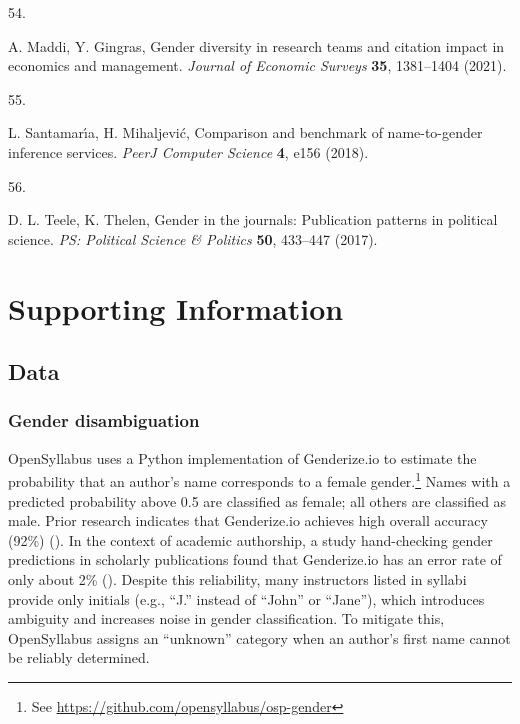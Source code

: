 \documentclass[
  british,
  11pt,
]{article}
\newlength{\cslhangindent}
\newlength{\csllabelwidth}
\newenvironment{CSLReferences}[2] %
 {\begin{list}{}{%
  \setlength{\itemindent}{0pt}
  \setlength{\leftmargin}{0pt}
  \setlength{\parsep}{0pt}
  \ifodd #1
   \setlength{\leftmargin}{\cslhangindent}
   \setlength{\itemindent}{-1\cslhangindent}
  \fi
  \setlength{\itemsep}{#2\baselineskip}}}
 {\end{list}}
\newcommand{\CSLLeftMargin}[1]{\parbox[t]{\csllabelwidth}{\strut#1\strut}}
\newcommand{\CSLRightInline}[1]{\parbox[t]{\linewidth - \csllabelwidth}{\strut#1\strut}}
\begin{document}
\begin{CSLReferences}{0}{1}
\CSLLeftMargin{54. }%
\CSLRightInline{A. Maddi, Y. Gingras, Gender diversity in research teams and citation impact in economics and management. \emph{Journal of Economic Surveys} \textbf{35}, 1381--1404 (2021).}

\CSLLeftMargin{55. }%
\CSLRightInline{L. Santamarı́a, H. Mihaljević, Comparison and benchmark of name-to-gender inference services. \emph{PeerJ Computer Science} \textbf{4}, e156 (2018).}

\CSLLeftMargin{56. }%
\CSLRightInline{D. L. Teele, K. Thelen, Gender in the journals: Publication patterns in political science. \emph{PS: Political Science \& Politics} \textbf{50}, 433--447 (2017).}

\end{CSLReferences}

\newpage
\appendix
\renewcommand{\thefigure}{SI-\arabic{figure}}
\renewcommand{\thesection}{SI}
\renewcommand{\thesubsection}{SI-\arabic{subsection}}

\setcounter{figure}{0}
\setcounter{table}{0}
\setcounter{section}{0}
\setcounter{subsection}{0}
\renewcommand{\thetable}{SI-\arabic{table}}

\section{Supporting Information}\label{supporting-information}

\subsection{Data}\label{data}

\subsubsection{Gender disambiguation}\label{gender-disambiguation}

OpenSyllabus uses a Python implementation of Genderize.io to estimate the probability that an author's name corresponds to a female gender.\footnote{See \url{https://github.com/opensyllabus/osp-gender}} Names with a predicted probability above 0.5 are classified as female; all others are classified as male. Prior research indicates that Genderize.io achieves high overall accuracy (92\%) (). In the context of academic authorship, a study hand-checking gender predictions in scholarly publications found that Genderize.io has an error rate of only about 2\% (). Despite this reliability, many instructors listed in syllabi provide only initials (e.g., ``J.'' instead of ``John'' or ``Jane''), which introduces ambiguity and increases noise in gender classification. To mitigate this, OpenSyllabus assigns an ``unknown'' category when an author's first name cannot be reliably determined.
\end{document}
